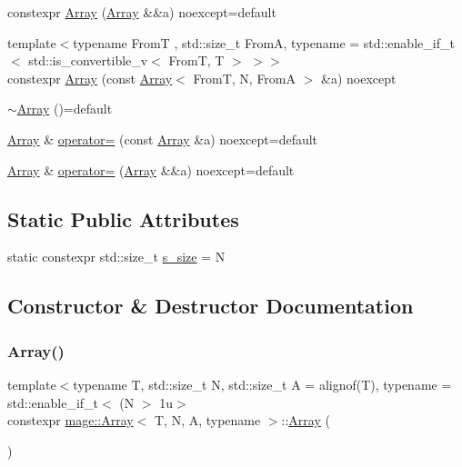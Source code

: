 \begin{DoxyCompactItemize}
constexpr \mbox{\hyperlink{structmage_1_1_array_a4cf0fb395b42d53b6e59868739dc9613}{Array}} (\mbox{\hyperlink{structmage_1_1_array}{Array}} \&\&a) noexcept=default
\item 
{\footnotesize template$<$typename FromT , std\+::size\+\_\+t FromA, typename  = std\+::enable\+\_\+if\+\_\+t$<$ std\+::is\+\_\+convertible\+\_\+v$<$ From\+T, T $>$ $>$$>$ }\\constexpr \mbox{\hyperlink{structmage_1_1_array_a950b26208c3546704f42e92c312a93ed}{Array}} (const \mbox{\hyperlink{structmage_1_1_array}{Array}}$<$ FromT, N, FromA $>$ \&a) noexcept
\item 
\mbox{\hyperlink{structmage_1_1_array_a7adc09166915789b93a7a3af118182e0}{$\sim$\+Array}} ()=default
\item 
\mbox{\hyperlink{structmage_1_1_array}{Array}} \& \mbox{\hyperlink{structmage_1_1_array_a216d8efaf044c3219a45e53073833ee0}{operator=}} (const \mbox{\hyperlink{structmage_1_1_array}{Array}} \&a) noexcept=default
\item 
\mbox{\hyperlink{structmage_1_1_array}{Array}} \& \mbox{\hyperlink{structmage_1_1_array_a33cb0dac90d7bf6c3973455ab12eb535}{operator=}} (\mbox{\hyperlink{structmage_1_1_array}{Array}} \&\&a) noexcept=default
\end{DoxyCompactItemize}
\subsection*{Static Public Attributes}
\begin{DoxyCompactItemize}
\item 
static constexpr std\+::size\+\_\+t \mbox{\hyperlink{structmage_1_1_array_ac4dbc8a376d8594b11afa8f1383d4241}{s\+\_\+size}} = N
\end{DoxyCompactItemize}


\subsection{Constructor \& Destructor Documentation}
\mbox{\label{structmage_1_1_array_ac1cf5733c005dfb79fb9e5e736098598}} 
\subsubsection{\texorpdfstring{Array()}{Array()}\hspace{0.1cm}{\footnotesize\ttfamily [1/10]}}
{\footnotesize\ttfamily template$<$typename T, std\+::size\+\_\+t N, std\+::size\+\_\+t A = alignof(\+T), typename  = std\+::enable\+\_\+if\+\_\+t$<$ (\+N $>$ 1u$>$ \\
constexpr \mbox{\hyperlink{structmage_1_1_array}{mage\+::\+Array}}$<$ T, N, A, typename $>$\+::\mbox{\hyperlink{structmage_1_1_array}{Array}} (\begin{DoxyParamCaption}{ }\end{DoxyParamCaption})\hspace{0.3cm}{\ttfamily [noexcept]}}

